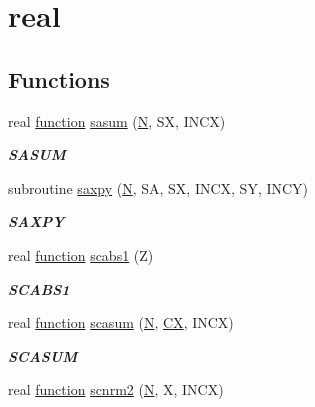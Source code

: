 \hypertarget{group__single__blas__level1}{}\section{real}
\label{group__single__blas__level1}
\subsection*{Functions}
\begin{DoxyCompactItemize}
\item 
real \hyperlink{afunc_8m_a7b5e596df91eadea6c537c0825e894a7}{function} \hyperlink{group__single__blas__level1_gafc5e1e8d9f26907c0a7cf878107f08cf}{sasum} (\hyperlink{polmisc_8c_a0240ac851181b84ac374872dc5434ee4}{N}, S\+X, I\+N\+C\+X)
\begin{DoxyCompactList}\small\item\em {\bfseries S\+A\+S\+U\+M} \end{DoxyCompactList}\item 
subroutine \hyperlink{group__single__blas__level1_gad2a52de0e32a6fc111931ece9b39726c}{saxpy} (\hyperlink{polmisc_8c_a0240ac851181b84ac374872dc5434ee4}{N}, S\+A, S\+X, I\+N\+C\+X, S\+Y, I\+N\+C\+Y)
\begin{DoxyCompactList}\small\item\em {\bfseries S\+A\+X\+P\+Y} \end{DoxyCompactList}\item 
real \hyperlink{afunc_8m_a7b5e596df91eadea6c537c0825e894a7}{function} \hyperlink{group__single__blas__level1_ga351f01fdf3baa8e6a71d56ded46b126d}{scabs1} (Z)
\begin{DoxyCompactList}\small\item\em {\bfseries S\+C\+A\+B\+S1} \end{DoxyCompactList}\item 
real \hyperlink{afunc_8m_a7b5e596df91eadea6c537c0825e894a7}{function} \hyperlink{group__single__blas__level1_gadd7d12f994e4868ca9998b054707d934}{scasum} (\hyperlink{polmisc_8c_a0240ac851181b84ac374872dc5434ee4}{N}, \hyperlink{scsum1_8c_a5a76da95c549c41790389a76e12fdcb5}{C\+X}, I\+N\+C\+X)
\begin{DoxyCompactList}\small\item\em {\bfseries S\+C\+A\+S\+U\+M} \end{DoxyCompactList}\item 
real \hyperlink{afunc_8m_a7b5e596df91eadea6c537c0825e894a7}{function} \hyperlink{group__single__blas__level1_gab0d23a73e9fd79e8a9c304fd282ab03d}{scnrm2} (\hyperlink{polmisc_8c_a0240ac851181b84ac374872dc5434ee4}{N}, X, I\+N\+C\+X)

\end{DoxyCompactItemize}
